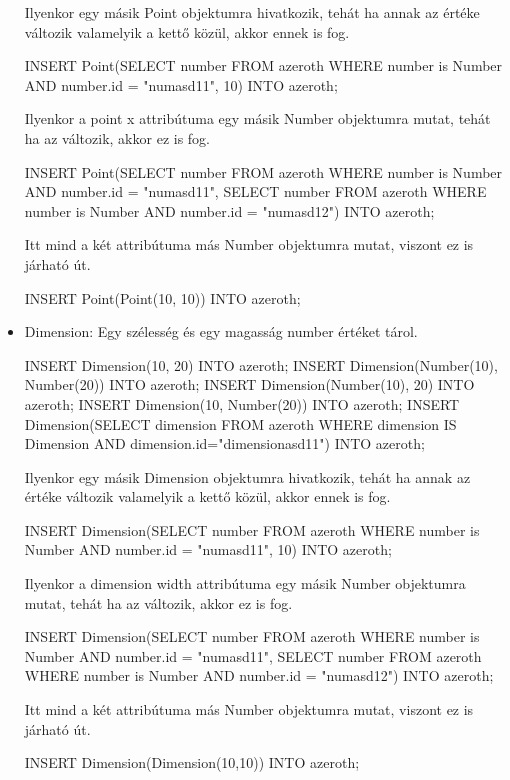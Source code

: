 \begin{itemize}
Ilyenkor egy másik Point objektumra hivatkozik, tehát ha annak az értéke változik valamelyik a kettő közül, akkor ennek is fog.

\begin{sql}
INSERT Point(SELECT number FROM azeroth WHERE number is Number AND number.id = "numasd11", 10) INTO azeroth;
\end{sql}

Ilyenkor a point x attribútuma egy másik Number objektumra mutat, tehát ha az változik, akkor ez is fog.
\begin{sql}
INSERT Point(SELECT number FROM azeroth WHERE number is Number AND number.id = "numasd11", SELECT number FROM azeroth WHERE number is Number AND number.id = "numasd12") INTO azeroth;
\end{sql}

Itt mind a két attribútuma más Number objektumra mutat, viszont ez is járható út.
\begin{sql}
INSERT Point(Point(10, 10)) INTO azeroth;
\end{sql}

\item Dimension: Egy szélesség és egy magasság number értéket tárol.
\begin{sql}
INSERT Dimension(10, 20) INTO azeroth;
INSERT Dimension(Number(10), Number(20)) INTO azeroth;
INSERT Dimension(Number(10), 20) INTO azeroth;
INSERT Dimension(10, Number(20)) INTO azeroth;
INSERT Dimension(SELECT dimension FROM azeroth WHERE dimension IS Dimension AND dimension.id="dimensionasd11") INTO azeroth;
\end{sql}

Ilyenkor egy másik Dimension objektumra hivatkozik, tehát ha annak az értéke változik valamelyik a kettő közül, akkor ennek is fog.

\begin{sql}
INSERT Dimension(SELECT number FROM azeroth WHERE number is Number AND number.id = "numasd11", 10) INTO azeroth;
\end{sql}

Ilyenkor a dimension width attribútuma egy másik Number objektumra mutat, tehát ha az változik, akkor ez is fog.

\begin{sql}
INSERT Dimension(SELECT number FROM azeroth WHERE number is Number AND number.id = "numasd11", SELECT number FROM azeroth WHERE number is Number AND number.id = "numasd12") INTO azeroth;
\end{sql}

Itt mind a két attribútuma más Number objektumra mutat, viszont ez is járható út.
\begin{sql}
INSERT Dimension(Dimension(10,10)) INTO azeroth;
\end{sql}


\end{itemize}
